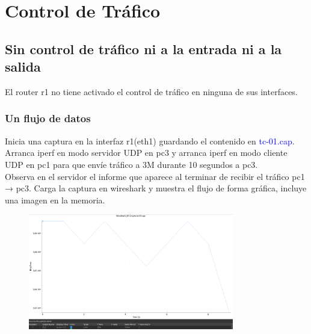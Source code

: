 \documentclass[12pt, a4paper]{report}
\begin{document}
\chapter{Control de Tráfico}
\section{Sin control de tráfico ni a la entrada ni a la salida}
El router r1 no tiene activado el control de tráfico en ninguna de sus interfaces.
\subsection{Un flujo de datos}
Inicia una captura en la interfaz r1(eth1) guardando el contenido en \textcolor{blue}{tc-01.cap}.\\

Arranca iperf en modo servidor UDP en pc3 y arranca iperf en modo cliente UDP en pc1 para
que envíe tráfico a 3M durante 10 segundos a pc3.\\

Observa en el servidor el informe que aparece al terminar de recibir el tráfico pc1 → pc3.
Carga la captura en wireshark y muestra el flujo de forma gráfica, incluye una imagen en la
memoria.
\begin{figure}[h]
	\centering
	\includegraphics[width=0.8\textwidth]{ej1.1.1}
\end{figure}
\end{document}
